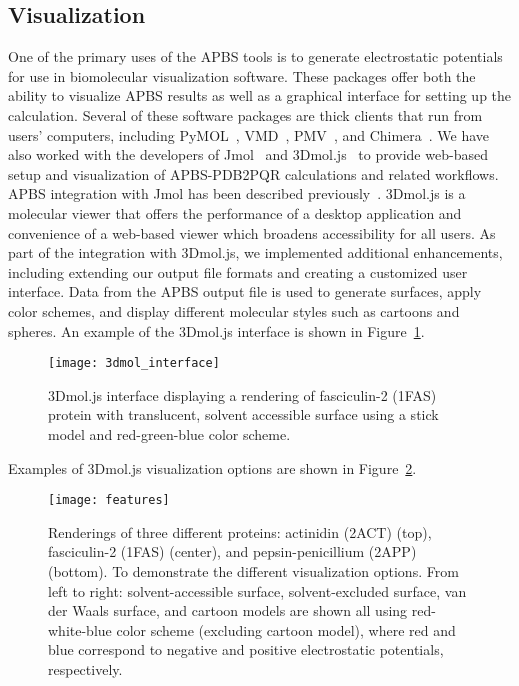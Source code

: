 \documentclass[12pt,titlepage]{article}
\newcommand{\revision}[1]{#1}
\begin{document}
\subsection{Visualization}
One of the primary uses of the APBS tools is to generate electrostatic potentials for use in biomolecular visualization software.
These packages offer both the ability to visualize APBS results as well as a graphical interface for setting up the calculation.
Several of these software packages are thick clients that run from users' computers, including PyMOL~\cite{PyMOL, PyMOLweb}, VMD~\cite{VMDweb, Humphrey1996}, PMV~\cite{PMV, MGLToolsweb}, and Chimera~\cite{Chimeraweb, Pettersen2004}.
We have also worked with the developers of Jmol~\cite{Jmolweb, Herraez2006} and 3Dmol.js~\cite{3Dmolweb, Rego2015} to provide web-based setup and visualization of APBS-PDB2PQR calculations and related workflows.
APBS integration with Jmol has been described previously~\cite{Unni2011}.
3Dmol.js is a molecular viewer that offers the performance of a desktop application and convenience of a web-based viewer which broadens accessibility for all users.
As part of the integration with 3Dmol.js, we implemented additional enhancements, including extending our output file formats and creating a customized user interface.
Data from the APBS output file is used to generate surfaces, apply color schemes, and display different molecular styles such as cartoons and spheres.
An example of the 3Dmol.js interface is shown in Figure~\ref{fig:3dmol_interface}.
\begin{figure} 
	\begin{center}
		\texttt{[image: 3dmol\_interface]}
		\caption{3Dmol.js interface displaying a rendering of fasciculin-2 (1FAS) protein with translucent, solvent accessible surface using a stick model and red-green-blue color scheme. \label{fig:3dmol_interface}}  
	\end{center}  
\end{figure}
Examples of 3Dmol.js visualization options are shown in Figure~\ref{fig:features}.
\begin{figure}
	\begin{center}
		\texttt{[image: features]}
		\caption{\revision{Renderings of three different proteins: actinidin (2ACT) (top), fasciculin-2 (1FAS) (center), and pepsin-penicillium (2APP) (bottom).}
		To demonstrate the different visualization options.
		From left to right: solvent-accessible surface, solvent-excluded surface, van der Waals  surface, and cartoon models are shown all using red-white-blue color scheme (excluding cartoon model), \revision{where red and blue correspond to negative and positive electrostatic potentials, respectively. \label{fig:features}}}
	\end{center}  
\end{figure}
\end{document}
